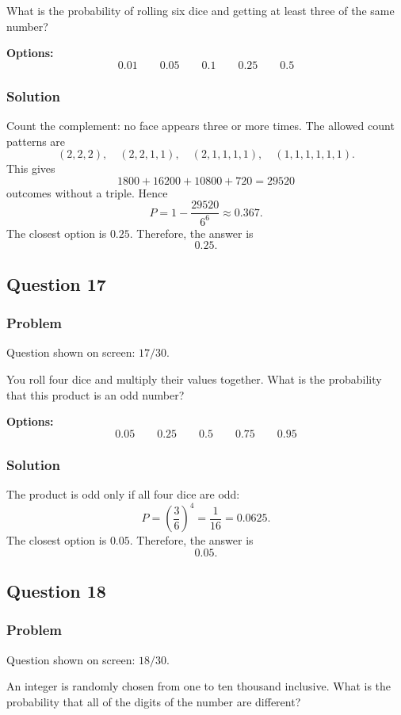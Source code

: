 \documentclass[12pt]{article}
\begin{document}
What is the probability of rolling six dice and getting at least three of the same number?

\noindent\textbf{Options:}
\[
\boxed{0.01}
\qquad
\boxed{0.05}
\qquad
\boxed{0.1}
\qquad
\boxed{0.25}
\qquad
\boxed{0.5}
\]

\subsubsection{Solution}
Count the complement: no face appears three or more times. The allowed count patterns are
\[
(2,2,2),\quad (2,2,1,1),\quad (2,1,1,1,1),\quad (1,1,1,1,1,1).
\]
This gives
\[
1800+16200+10800+720=29520
\]
outcomes without a triple. Hence
\[
P=1-\frac{29520}{6^6}\approx 0.367.
\]
The closest option is \(0.25\). Therefore, the answer is
\[
\boxed{0.25}.
\]

\subsection{Question 17}
\subsubsection{Problem}
Question shown on screen: \(17/30\).

You roll four dice and multiply their values together. What is the probability that this product is an odd number?

\noindent\textbf{Options:}
\[
\boxed{0.05}
\qquad
\boxed{0.25}
\qquad
\boxed{0.5}
\qquad
\boxed{0.75}
\qquad
\boxed{0.95}
\]

\subsubsection{Solution}
The product is odd only if all four dice are odd:
\[
P=\left(\frac{3}{6}\right)^4=\frac{1}{16}=0.0625.
\]
The closest option is \(0.05\). Therefore, the answer is
\[
\boxed{0.05}.
\]

\subsection{Question 18}
\subsubsection{Problem}
Question shown on screen: \(18/30\).

An integer is randomly chosen from one to ten thousand inclusive. What is the probability that all of the digits of the number are different?
\end{document}
